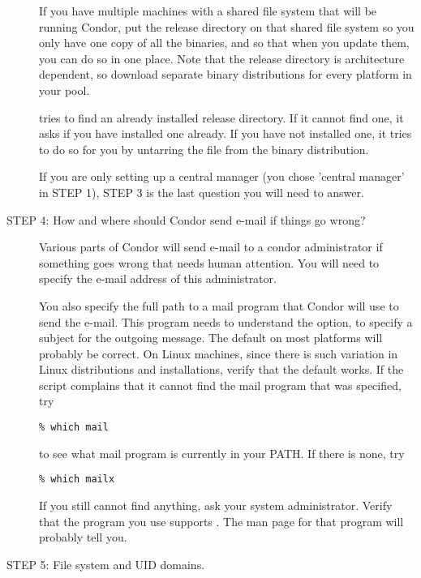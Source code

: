 \begin{description}
     If you have multiple machines with a shared file system that will
     be running Condor, put the release directory on that
     shared file system so you only have one copy of all the binaries,
     and so that when you update them, you can do so in one place.
     Note that the release directory is architecture dependent, so
     download separate binary distributions for every
     platform in your pool.

      tries to find an already installed release
     directory.  If it cannot find one, it asks if you have installed
     one already.  If you have not installed one, it tries to do so
     for you by untarring the  file from the binary
     distribution.  

\Note If you are only setting up a central manager (you chose 'central
     manager' in STEP 1), STEP 3 is the last question you will need to
     answer.

\item[STEP 4: How and where should Condor send e-mail if things go wrong?]

     Various parts of Condor will send e-mail to a condor administrator
     if something goes wrong that needs human attention.  You will
     need to specify the e-mail address of this administrator.  

     You also specify the full path to a mail program
     that Condor will use to send the e-mail.  This program needs to
     understand the  option, to specify a subject
     for the outgoing message.  The default on most platforms will
     probably be correct.  On Linux machines, since there is such
     variation in Linux distributions and installations,
     verify that the default works.  If the script complains that it
     cannot find the mail program that was specified, try
\begin{verbatim}
% which mail
\end{verbatim}
     to see what mail program is
     currently in your PATH.  If there is none, try 
\begin{verbatim}
% which mailx
\end{verbatim}
     If you still cannot find anything, ask your system administrator.
     Verify that the program you use supports
     .  The man page for that program will probably tell you.

\item[STEP 5: File system and UID domains.]


\end{description}
